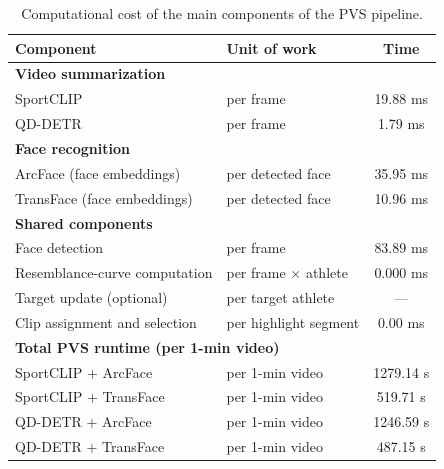 
\begin{table}
    \centering
    \footnotesize
    \caption{Computational cost of the main components of the PVS pipeline.}
    \label{tab: PVS - computational cost}
    \begin{tabular}{l l c}
        \hline
        \textbf{Component}                          & \textbf{Unit of work}         & \textbf{Time} \\
        \hline
        \multicolumn{3}{l}{\textbf{Video summarization}} \\
        \quad SportCLIP                             & per frame                     & 19.88 ms \\
        \quad QD-DETR                               & per frame                     & 1.79 ms \\
        \hline
        \multicolumn{3}{l}{\textbf{Face recognition}} \\
        \quad ArcFace (face embeddings)             & per detected face             & 35.95 ms \\
        \quad TransFace (face embeddings)           & per detected face             & 10.96 ms \\
        \hline
        \multicolumn{3}{l}{\textbf{Shared components}} \\
        \quad Face detection                        & per frame                     & 83.89 ms \\
        \quad Resemblance-curve computation         & per frame $\times$ athlete    & 0.000 ms \\
        \quad Target update (optional)              & per target athlete            & --- \\
        \quad Clip assignment and selection         & per highlight segment         & 0.00 ms \\
        \hline
        \multicolumn{3}{l}{\textbf{Total PVS runtime (per 1-min video)}} \\
        SportCLIP + ArcFace                      & per 1-min video                & 1279.14 s \\
        SportCLIP + TransFace                    & per 1-min video                & 519.71 s \\
        QD-DETR + ArcFace                        & per 1-min video                & 1246.59 s \\
        QD-DETR + TransFace                      & per 1-min video                & 487.15 s \\

\end{tabular}
\end{table}
